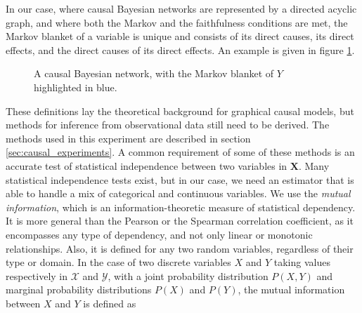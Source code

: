 In our case, where causal Bayesian networks are represented by a directed
acyclic graph, and where both the Markov and the faithfulness
conditions are met, the Markov blanket of a variable is unique and consists of
its direct causes, its direct effects, and the direct causes of its direct
effects. An example is given in figure \ref{fig:markov_blanket}.

\begin{figure}
    \centering
    \caption{A causal Bayesian network, with the Markov blanket of $Y$
    highlighted in blue.}
    \label{fig:markov_blanket}
\end{figure}

These definitions lay the theoretical background for graphical causal models,
but methods for inference from observational data still need to be derived. The
methods used in this experiment are described in section
\ref{sec:causal_experiments}. A common requirement of some of these methods is
an accurate test of statistical independence between two variables in $\bm X$.
Many statistical independence tests exist, but in our case, we need an estimator
that is able to handle a mix of categorical and continuous variables. We use the
\emph{mutual information}, which is an information-theoretic measure of
statistical dependency. It is more general than the Pearson or the Spearman
correlation coefficient, as it encompasses any type of dependency, and not only
linear or monotonic relationships. Also, it is defined for any two random
variables, regardless of their type or domain. In the case of two discrete
variables $X$ and $Y$ taking values respectively in $\mathcal X$ and $\mathcal
Y$, with a joint probability distribution $P(X, Y)$ and marginal probability
distributions $P(X)$ and $P(Y)$, the mutual information between $X$ and  $Y$ is
defined as \parencite{cover2012elements}

